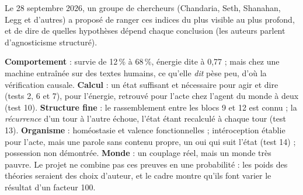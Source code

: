 \documentclass[fontsize=10pt,paper=a4,parskip=half-]{scrartcl}
\newcommand{\q}[1]{\og #1\fg{}}
\newcommand{\pc}{\,\%}
\begin{document}
Le 28 septembre 2026, un groupe de chercheurs (Chandaria, Seth, Shanahan, Legg et
d'autres) a proposé de ranger ces indices du plus visible au plus profond, et de dire de
quelles hypothèses dépend chaque conclusion (les auteurs parlent d'\q{agnosticisme
structuré}).

\begin{center}
\end{center}

\textbf{Comportement} : survie de 12\pc{} à 68\pc, énergie dite à 0,77 ; mais chez une
machine entraînée sur des textes humains, ce qu'elle \emph{dit} pèse peu, d'où la
vérification causale. \textbf{Calcul} : un état suffisant et nécessaire pour agir et dire
(tests 2, 6 et 7), pour l'énergie, retrouvé pour l'acte chez l'agent du monde à deux
(test 10). \textbf{Structure fine} : le rassemblement entre les blocs 9 et 12 est connu ;
la \emph{récurrence} d'un tour à l'autre échoue, l'état étant recalculé à chaque tour
(test 13). \textbf{Organisme} : homéostasie et valence fonctionnelles ; intéroception
établie pour l'acte, mais une parole sans contenu propre, un \q{oui} qui suit l'état
(test 14) ; possession non démontrée. \textbf{Monde} : un couplage réel, mais un monde très pauvre. Le
projet ne combine pas ces preuves en une probabilité : les poids des théories seraient des
choix d'auteur, et le cadre montre qu'ils font varier le résultat d'un facteur 100.
\end{document}
